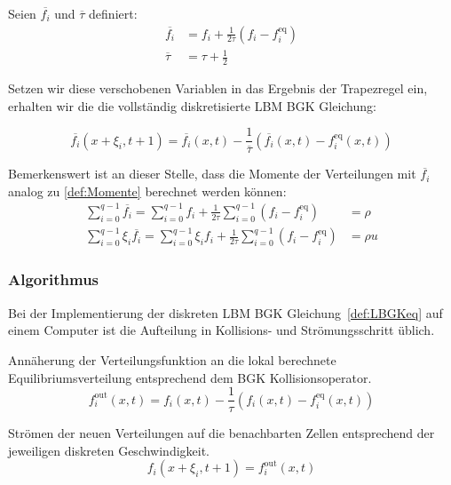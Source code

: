 \begin{Definition}
\label{def:LBGKeq}
Seien \(\overline{f_i}\) und \(\overline\tau\) definiert:
\begin{align*}
\overline{f_i} &= f_i + \frac{1}{2\tau}(f_i - f_i^\text{eq}) \\
\overline\tau &= \tau + \frac{1}{2}
\end{align*}

Setzen wir diese verschobenen Variablen in das Ergebnis der Trapezregel ein, erhalten \cite[Kap.~A.5 mit \(\Delta t=1\)]{Krueger17} wir die die vollständig diskretisierte LBM BGK Gleichung:

\[\overline{f_i}(x+\xi_i,t+1) = \overline{f_i}(x,t) - \frac{1}{\overline\tau} (\overline{f_i}(x,t) - f_i^\text{eq}(x,t))\]
\end{Definition}

Bemerkenswert ist an dieser Stelle, dass die Momente der Verteilungen mit \(\overline{f_i}\) analog zu \ref{def:Momente} berechnet werden können:
\begin{align*}
\sum_{i=0}^{q-1} \overline{f_i} = \sum_{i=0}^{q-1} f_i + \frac{1}{2\tau} \sum_{i=0}^{q-1} (f_i - f_i^\text{eq}) &= \rho \\
\sum_{i=0}^{q-1} \xi_i \overline{f_i} = \sum_{i=0}^{q-1} \xi_i f_i + \frac{1}{2\tau} \sum_{i=0}^{q-1} (f_i - f_i^\text{eq}) &= \rho u
\end{align*}

\newpage
\subsubsection{Algorithmus}\label{kap:LBMimpl}

Bei der Implementierung der {diskreten LBM BGK Gleichung}~\ref{def:LBGKeq} auf einem Computer ist die Aufteilung in Kollisions- und Strömungsschritt üblich.

\begin{Definition}[Kollisionsschritt]
Annäherung der Verteilungsfunktion an die lokal berechnete Equilibriumsverteilung entsprechend dem BGK Kollisionsoperator.
\[f_i^\text{out}(x,t) = f_i(x,t) - \frac{1}{\tau}(f_i(x,t) - f_i^\text{eq}(x,t))\]
\end{Definition}

\begin{Definition}[Strömungsschritt]
Strömen der neuen Verteilungen auf die benachbarten Zellen entsprechend der jeweiligen diskreten Geschwindigkeit.
\[f_i(x+\xi_i,t+1) = f_i^\text{out}(x,t)\]
\end{Definition}

